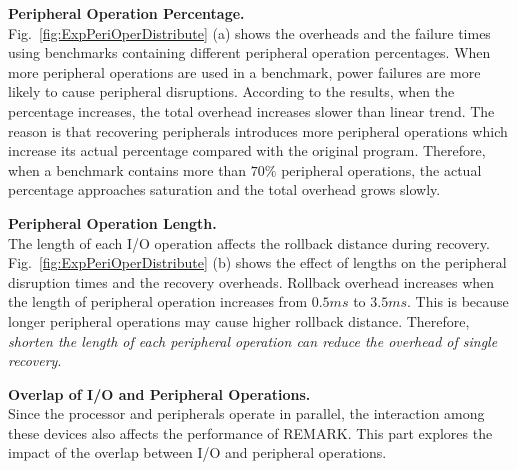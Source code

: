 \noindent\textbf{Peripheral Operation Percentage.} \\
Fig.~\ref{fig:ExpPeriOperDistribute} (a) shows the overheads and the failure times using benchmarks containing different peripheral operation percentages.
When more peripheral operations are used in a benchmark, power failures are more likely to cause peripheral disruptions.
According to the results, when the percentage increases, the total overhead increases slower than linear trend.
The reason is that recovering peripherals introduces more peripheral operations which increase its actual percentage compared with the original program.
Therefore, when a benchmark contains more than $70\%$ peripheral operations, the actual percentage approaches saturation and the total overhead grows slowly.

\noindent\textbf{Peripheral Operation Length.} \\
The length of each I/O operation affects the rollback distance during recovery.
Fig.~\ref{fig:ExpPeriOperDistribute} (b) shows the effect of lengths on the peripheral disruption times and the recovery overheads.
Rollback overhead increases when the length of peripheral operation increases from $0.5ms$ to $3.5ms$.
This is because longer peripheral operations may cause higher rollback distance.
Therefore, \emph{shorten the length of each peripheral operation can reduce the overhead of single recovery}.

\begin{comment}
Fig.~\ref{fig:ExpPeriOperDistribute} (b) shows that more peripheral disruptions take place when the length grows.
In statistics analysis, the peripheral disruption rate is affected only by peripheral operation percentage.
However, longer peripheral recover procedure increases this percentage, causes significant avalanche effects and leads to higher peripheral disruption rate.
In conclusion, \emph{the longer I/O operation length also increases the I/O disruption probability because of the avalanche effect}.
\end{comment}

\noindent\textbf{Overlap of I/O and Peripheral Operations.} \\
%
Since the processor and peripherals operate in parallel, the interaction among these devices also affects the performance of REMARK.
This part explores the impact of the overlap between I/O and peripheral operations.


